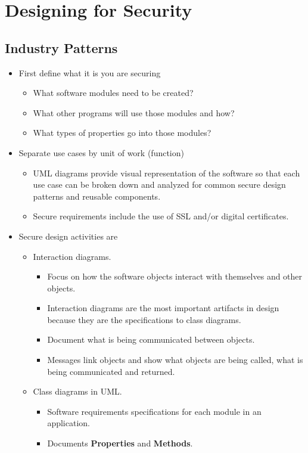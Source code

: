 \documentclass[12pt]{article}
\begin{document}
\section{Designing for Security}
\subsection{Industry Patterns}
\begin{itemize}
	\item First define what it is you are securing
		\begin{itemize}
			\item What software modules need to be created?
			\item What other programs will use those modules and how?
			\item What types of properties go into those modules?
		\end{itemize}
	\item Separate use cases by unit of work (function)
		\begin{itemize}
			\item UML diagrams provide visual representation of the software so that
				each use case can be broken down and analyzed for common secure 
				design patterns and reusable components.
			\item Secure requirements include the use of SSL and/or digital certificates.
		\end{itemize}
	\item Secure design activities are
		\begin{itemize}
			\item Interaction diagrams.
				\begin{itemize}
					\item Focus on how the software objects interact with themselves
						and other objects.
					\item Interaction diagrams are the most important artifacts in
						design because they are the specifications to class diagrams.
					\item Document what is being communicated between objects.
					\item Messages link objects and show what objects are being called,
						what is being communicated and returned.
				\end{itemize}
			\item Class diagrams in UML.
				\begin{itemize}
					\item Software requirements specifications for each module in an
						application.
					\item Documents \textbf{Properties} and \textbf{Methods}.
				\end{itemize}


\end{itemize}
\end{itemize}
\end{document}
